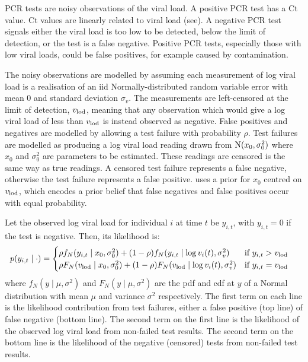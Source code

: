 \documentclass[thesis.tex]{subfiles}
\begin{document}
PCR tests are noisy observations of the viral load.
A positive PCR test has a Ct value.
Ct values are linearly related to viral load (see).
A negative PCR test signals either the viral load is too low to be detected, \ie below the limit of detection, or the test is a false negative.
Positive PCR tests, especially those with low viral loads, could be false positives, for example caused by contamination.

The noisy observations are modelled by assuming each measurement of log viral load is a realisation of an iid Normally-distributed random variable error with mean 0 and standard deviation $\sigma_v$.
The measurements are left-censored at the limit of detection, $v_\text{lod}$, meaning that any observation which would give a log viral load of less than $v_\text{lod}$ is instead observed as negative.
False positives and negatives are modelled by allowing a test failure with probability $\rho$.
Test failures are modelled as producing a log viral load reading drawn from $\operatorname{N}(x_0, \sigma_0^2)$ where $x_0$ and $\sigma_0^2$ are parameters to be estimated.
These readings are censored is the same way as true readings.
A censored test failure represents a false negative, otherwise the test failure represents a false positive.
\textcite{hakkiOnset} uses a prior for $x_0$ centred on $v_\text{lod}$, which encodes a prior belief that false negatives and false positives occur with equal probability.

Let the observed log viral load for individual $i$ at time $t$ be $y_{i,t}$, with $y_{i,t}=0$ if the test is negative.
Then, its likelihood is:
\begin{align}
p(y_{i,t} \mid \cdot) &= \begin{cases}
    \rho f_N(y_{i,t} \mid x_0, \sigma_0^2) + (1 - \rho) f_N(y_{i,t} \mid \log v_i(t), \sigma_v^2) & \text{if $y_{i,t} > v_\text{lod}$}\\
    \rho F_N(v_\text{lod} \mid x_0, \sigma_0^2) + (1 - \rho) F_N(v_\text{lod} \mid \log v_i(t), \sigma_v^2) & \text{if $y_{i,t} = v_\text{lod}$} \label{ATACCC:eq:hakki-likelihood}
\end{cases}
\end{align}
where $f_N(y \mid \mu, \sigma^2)$ and $F_N(y \mid \mu, \sigma^2)$ are the pdf and cdf at $y$ of a Normal distribution with mean $\mu$ and variance $\sigma^2$ respectively.
The first term on each line is the likelihood contribution from test failures, either a false positive (top line) of false negative (bottom line).
The second term on the first line is the likelihood of the observed log viral load from non-failed test results.
The second term on the bottom line is the likelihood of the negative (censored) tests from non-failed test results.
\end{document}
